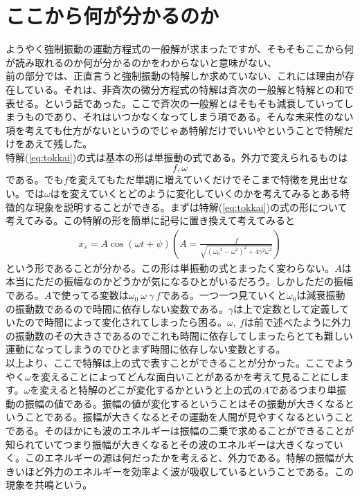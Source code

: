 \section{ここから何が分かるのか}
ようやく強制振動の運動方程式の一般解が求まったですが、そもそもここから何が読み取れるのか何が分かるのかをわからないと意味がない、\\
前の部分では、正直言うと強制振動の特解しか求めていない、これには理由が存在している。それは、非斉次の微分方程式の特解は斉次の一般解と特解との和で表せる。という話であった。ここで斉次の一般解とはそもそも減衰していってしまうものであり、それはいつかなくなってしまう項である。そんな未来性のない項を考えても仕方がないというのでじゃあ特解だけでいいやということで特解だけをあえて残した。\\
特解(\ref{eq:tokkai})の式は基本の形は単振動の式である。外力で変えられるものは
\[
f , \omega
\]
である。でも$f$を変えてもただ単調に増えていくだけでそこまで特徴を見出せない。では$\omega$はを変えていくとどのように変化していくのかを考えてみるとある特徴的な現象を説明することができる。まずは特解(\ref{eq:tokkai})の式の形について考えてみる。この特解の形を簡単に記号に置き換えて考えてみると
\begin{eqnarray}
  x_s = A\cos(\omega t + \psi)　　\left(A = \frac{f}{\sqrt{({\omega_0}^2-\omega^2)^2+4\gamma^2\omega^2}} \right)
\end{eqnarray}
という形であることが分かる。この形は単振動の式とまったく変わらない。$A$は本当にただの振幅なのかどうかが気になるひとがいるだろう。しかしただの振幅である。$A$で使ってる変数は$\omega_0\ \omega \ \gamma \  f$である。一つ一つ見ていくと$\omega_0$は減衰振動の振動数であるので時間に依存しない変数である。$\gamma$は上で定数として定義していたので時間によって変化されてしまったら困る。$\omega ,\ f$は前で述べたように外力の振動数のその大きさであるのでこれも時間に依存してしまったらとても難しい運動になってしまうのでひとまず時間に依存しない変数とする。\\
以上より、ここで特解は上の式で表すことができることが分かった。ここでようやく$\omega$を変えることによってどんな面白いことがあるかを考えて見ることにします。$\omega$を変えると特解のどこが変化するかというと上の式の$A$であるつまり単振動の振幅の値である。振幅の値が変化するということはその振動が大きくなるということである。振幅が大きくなるとその運動を人間が見やすくなるということである。そのほかにも波のエネルギーは振幅の二乗で求めることができることが知られていてつまり振幅が大きくなるとその波のエネルギーは大きくなっていく。このエネルギーの源は何だったかを考えると、外力である。特解の振幅が大きいほど外力のエネルギーを効率よく波が吸収しているということである。この現象を共鳴という。\\
